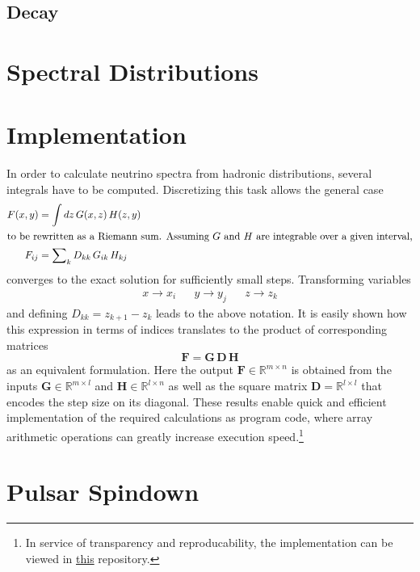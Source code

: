 \subsection*{Decay}

\section{Spectral Distributions}
\label{sec:spectral}

\section{Implementation}
\label{sec:implementation}

In order to calculate neutrino spectra from hadronic distributions, several integrals have to be computed. Discretizing
this task allows the general case
\begin{align*}
	F(x, y) &= \int dz \, G(x, z) \, H(z, y) \\
	\intertext{to be rewritten as a Riemann sum. Assuming $G$ and $H$ are integrable over a given interval,}
	F_{ij} &= \sum\nolimits_k D_{kk} \, G_{ik} \, H_{kj}
\end{align*}
converges to the exact solution for sufficiently small steps. Transforming variables
\begin{align*}
	&&&& x \rightarrow x_i && y \rightarrow y_j && z \rightarrow z_k &&&&
\end{align*}
and defining $D_{kk} = z_{k+1} - z_k$ leads to the above notation. It is easily shown how this expression in terms of
indices translates to the product of corresponding matrices
\begin{equation*}
	\bm{F} = \bm{G} \, \bm{D} \, \bm{H}
\end{equation*}
as an equivalent formulation. Here the output $\bm{F} \in \mathbb{R}^{m \times n}$ is obtained from the inputs
$\bm{G} \in \mathbb{R}^{m \times l}$ and $\bm{H} \in \mathbb{R}^{l \times n}$ as well as the square matrix
$\bm{D} = \mathbb{R}^{l \times l}$ that encodes the step size on its diagonal. These results enable quick and
efficient implementation of the required calculations as program code, where array arithmetic operations can greatly
increase execution speed.\footnote{In service of transparency and reproducability, the implementation can be viewed
in \href{https://github.com/fritzali/bachelor}{this} repository.}

\section{Pulsar Spindown}
\label{sec:spindown}
